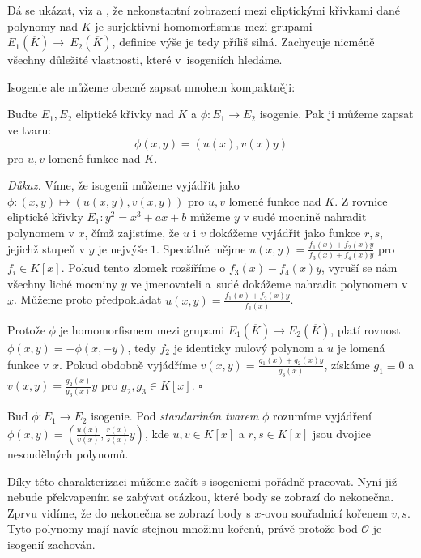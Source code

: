 \documentclass[12pt]{report}
\begin{document}
Dá se ukázat, viz \cite[II.6.8.]{Hartshorne} a \cite[III.4.8.]{Silverman}, že nekonstantní zobrazení mezi eliptickými křivkami dané polynomy nad $K$ je surjektivní homomorfismus mezi grupami $E_1 (\overline{K}) \longrightarrow~E_2(\overline{K})$, definice výše je tedy příliš silná. Zachycuje nicméně všechny důležité vlastnosti, které v~isogeniích hledáme. 

Isogenie ale můžeme obecně zapsat mnohem kompaktněji:
\begin{veta}
Buďte $E_1,E_2$ eliptické křivky nad $K$ a $\phi : E_1 \longrightarrow E_2 $ isogenie. Pak ji můžeme zapsat ve tvaru:
\begin{equation*}
\phi(x,y) = \left(u(x), v(x) y \right)
\end{equation*}
pro $u,v$ lomené funkce nad $K$.  
\end{veta}

\noindent \textit{Důkaz.} Víme, že isogenii můžeme vyjádřit jako $\phi: (x,y) \mapsto (u(x,y),v(x,y))$ pro $u,v$ lomené funkce nad $K$. Z rovnice eliptické křivky $E_1 : y^2 = x^3 + ax +b$ můžeme $y$ v sudé mocnině nahradit polynomem v $x$, čímž zajistíme, že $u$ i $v$ dokážeme vyjádřit jako funkce $r,s$, jejichž stupeň v $y$ je nejvýše $1$. Speciálně mějme $u(x,y) = \frac{f_1(x)+f_2(x)y}{f_3(x)+f_4(x) y}$ pro $f_i \in K[x]$. Pokud  tento zlomek rozšíříme o $f_3(x)-f_4(x)y$, vyruší se nám všechny liché mocniny $y$ ve jmenovateli a~sudé dokážeme nahradit polynomem v $x$. Můžeme proto předpokládat $u(x,y) = \frac{f_1(x)+f_2(x)y}{f_3(x)}$.

Protože $\phi$ je homomorfismem mezi grupami $E_1(\overline{K}) \longrightarrow E_2(\overline{K})$, platí rovnost $\phi(x,y) = -\phi(x,-y)$, tedy $f_2$ je identicky nulový polynom a $u$ je lomená funkce v $x$. Pokud obdobně vyjádříme $v(x,y) = \frac{g_1(x)+g_2(x)y}{g_3(x)}$, získáme $g_1 \equiv 0$ a $v(x,y) = \frac{g_2(x)}{g_3(x)}y$ pro $g_2,g_3 \in K[x]$. \hfill $\square$\\

\begin{definice}\label{covfefe}
Buď $\phi : E_1 \longrightarrow E_2$ isogenie. Pod \textit{standardním tvarem} $\phi$ rozumíme vyjádření $ \phi(x,y) = \left(\frac{u(x)}{v(x)}, \frac{r(x)}{s(x)} y \right)$, kde $u,v \in K[x]$ a $r,s \in K[x]$ jsou dvojice nesoudělných polynomů.
\end{definice}

Díky této charakterizaci můžeme začít s isogeniemi pořádně pracovat. Nyní již nebude překvapením se zabývat otázkou, které body se zobrazí do nekonečna. Zprvu vidíme, že do nekonečna se zobrazí body s $x$-ovou souřadnicí kořenem $v,s$. Tyto polynomy mají navíc stejnou množinu kořenů, právě protože bod $\mathcal{O}$ je isogenií zachován. 
\end{document}
